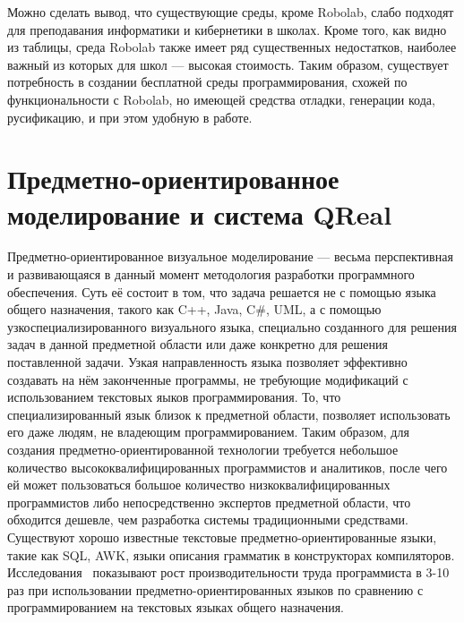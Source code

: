 \documentclass[a4paper]{article}
\begin{document}
Можно сделать вывод, что существующие среды, кроме Robolab, слабо подходят для преподавания информатики и кибернетики в школах. Кроме того, как видно из таблицы, среда Robolab также имеет ряд существенных недостатков, наиболее важный из которых для школ --- высокая стоимость. Таким образом, существует потребность в создании бесплатной среды программирования, схожей по функциональности с Robolab, но имеющей средства отладки, генерации кода, русификацию, и при этом удобную в работе.

\section{Предметно-ориентированное моделирование и система QReal}
Предметно-ориентированное визуальное моделирование --- весьма перспективная и развивающаяся в данный момент методология разработки программного обеспечения. Суть её состоит в том, что задача решается не с помощью языка общего назначения, такого как C++, Java, C\#, UML, а с помощью узкоспециализированного визуального языка, специально созданного для решения задач в данной предметной области или даже конкретно для решения поставленной задачи. Узкая направленность языка позволяет эффективно создавать на нём законченные программы, не требующие модификаций с использованием текстовых яыков программирования. То, что специализированный язык близок к предметной области, позволяет использовать его даже людям, не владеющим программированием. Таким образом, для создания предметно-ориентированной технологии требуется небольшое количество высококвалифицированных программистов и аналитиков, после чего ей может пользоваться большое количество низкоквалифицированных программистов либо непосредственно экспертов предметной области, что обходится дешевле, чем разработка системы традиционными средствами. Существуют хорошо известные текстовые предметно-ориентированные языки, такие как SQL, AWK, языки описания грамматик в конструкторах компиляторов. Исследования~\cite{kelly, kieburtz, weiss} показывают рост производительности труда программиста в 3-10 раз при использовании предметно-ориентированных языков по сравнению с программированием на текстовых языках общего назначения.
\end{document}
